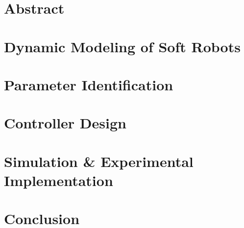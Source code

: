 \documentclass[11pt,twoside]{report}
\begin{document}

\thispagestyle{empty}



\chapter*{Abstract}

\cleardoublepage

\tableofcontents

\cleardoublepage

\cleardoublepage








\cleardoublepage

\chapter{Dynamic Modeling of Soft Robots}
%
\cleardoublepage

\chapter{Parameter Identification}
%
\cleardoublepage


\chapter{Controller Design}
%
\cleardoublepage


\chapter{Simulation \& Experimental Implementation}

\cleardoublepage

\chapter{Conclusion}
%

%
\end{document}
